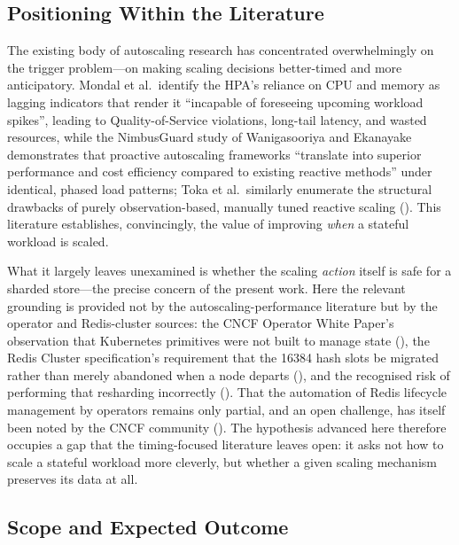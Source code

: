 \subsection{Positioning Within the Literature}

The existing body of autoscaling research has concentrated overwhelmingly on the trigger
problem---on making scaling decisions better-timed and more anticipatory. Mondal et al.\
identify the HPA's reliance on CPU and memory as lagging indicators that render it
\enquote{incapable of foreseeing upcoming workload spikes}, leading to Quality-of-Service
violations, long-tail latency, and wasted resources, while the NimbusGuard study of
Wanigasooriya and Ekanayake demonstrates that proactive autoscaling frameworks
\enquote{translate into superior performance and cost efficiency compared to existing
reactive methods} under identical, phased load patterns; Toka et al.\ similarly enumerate
the structural drawbacks of purely observation-based, manually tuned reactive scaling
(\cite{arxiv:nimbusguard}). This literature establishes, convincingly, the value of
improving \textit{when} a stateful workload is scaled.

What it largely leaves unexamined is whether the scaling \textit{action} itself is safe for a
sharded store---the precise concern of the present work. Here the relevant grounding is
provided not by the autoscaling-performance literature but by the operator and
Redis-cluster sources: the CNCF Operator White Paper's observation that Kubernetes
primitives were not built to manage state (\cite{cncf:operatorwhitepaper}), the Redis
Cluster specification's requirement that the \num{16384} hash slots be migrated rather than
merely abandoned when a node departs (\cite{redis:clusterspec}), and the recognised risk of
performing that resharding incorrectly (\cite{googlecloud:zerodowntime}). That the
automation of Redis lifecycle management by operators remains only partial, and an open
challenge, has itself been noted by the CNCF community (\cite{cncf:redisoperator}). The
hypothesis advanced here therefore occupies a gap that the timing-focused literature leaves
open: it asks not how to scale a stateful workload more cleverly, but whether a given
scaling mechanism preserves its data at all.

\subsection{Scope and Expected Outcome}

